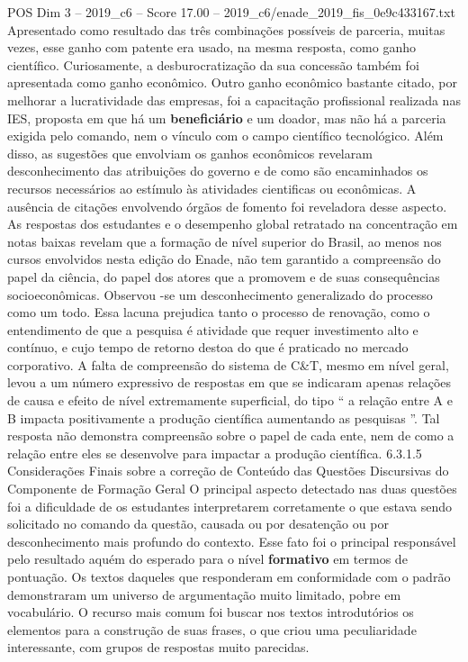\begin{textsample}{POS Dim 3 – 2019\_c6 – Score 17.00 – 2019\_c6/enade\_2019\_fis\_0e9c433167.txt}
Apresentado como resultado das três combinações possíveis de parceria, muitas vezes, esse ganho com patente era usado, na mesma resposta, como ganho científico.
Curiosamente, a desburocratização da sua concessão também foi apresentada como ganho econômico.
Outro ganho econômico bastante citado, por melhorar a lucratividade das empresas, foi a capacitação profissional realizada nas IES, proposta em que há um \textbf{beneficiário} e um doador, mas não há a parceria exigida pelo comando, nem o vínculo com o campo científico tecnológico.
Além disso, as sugestões que envolviam os ganhos econômicos revelaram desconhecimento das atribuições do governo e de como são encaminhados os recursos necessários ao estímulo às atividades cientificas ou econômicas.
A ausência de citações envolvendo órgãos de fomento foi reveladora desse aspecto.
As respostas dos estudantes e o desempenho global retratado na concentração em notas baixas revelam que a formação de nível superior do Brasil, ao menos nos cursos envolvidos nesta edição do Enade, não tem garantido a compreensão do papel da ciência, do papel dos atores que a promovem e de suas consequências socioeconômicas.
Observou -se um desconhecimento generalizado do processo como um todo.
Essa lacuna prejudica tanto o processo de renovação, como o entendimento de que a pesquisa é atividade que requer investimento alto e contínuo, e cujo tempo de retorno destoa do que é praticado no mercado corporativo.
A falta de compreensão do sistema de C\&T, mesmo em nível geral, levou a um número expressivo de respostas em que se indicaram apenas relações de causa e efeito de nível extremamente superficial, do tipo “ a relação entre A e B impacta positivamente a produção científica aumentando as pesquisas ”.
Tal resposta não demonstra compreensão sobre o papel de cada ente, nem de como a relação entre eles se desenvolve para impactar a produção científica. 6.3.1.5 Considerações Finais sobre a correção de Conteúdo das Questões Discursivas do Componente de Formação Geral O principal aspecto detectado nas duas questões foi a dificuldade de os estudantes interpretarem corretamente o que estava sendo solicitado no comando da questão, causada ou por desatenção ou por desconhecimento mais profundo do contexto.
Esse fato foi o principal responsável pelo resultado aquém do esperado para o nível \textbf{formativo} em termos de pontuação.
Os textos daqueles que responderam em conformidade com o padrão demonstraram um universo de argumentação muito limitado, pobre em vocabulário.
O recurso mais comum foi buscar nos textos introdutórios os elementos para a construção de suas frases, o que criou uma peculiaridade interessante, com grupos de respostas muito parecidas.

\end{textsample}
